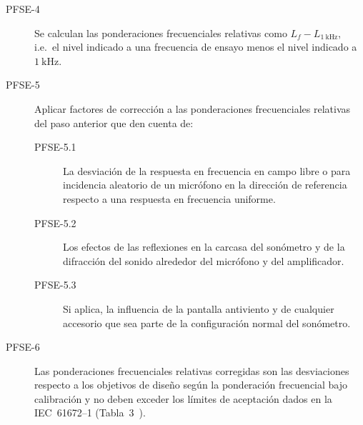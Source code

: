 \begin{description}
    \item[PFSE-4] Se calculan las ponderaciones frecuenciales relativas como $L_{f} - L_{\qty{1}{\kHz}}$, i.e.\ el nivel indicado a una frecuencia de ensayo menos el nivel indicado a $\qty{1}{\kHz}$.

    \item[PFSE-5] Aplicar factores de corrección a las ponderaciones frecuenciales relativas del paso anterior que den cuenta de:
%
    \begin{description}
        \item[PFSE-5.1] La desviación de la respuesta en frecuencia en campo libre o para incidencia aleatorio de un micrófono en la dirección de referencia respecto a una respuesta en frecuencia uniforme.
        \item[PFSE-5.2] Los efectos de las reflexiones en la carcasa del sonómetro y de la difracción del sonido alrededor del micrófono y del amplificador.
        \item[PFSE-5.3] Si aplica, la influencia de la pantalla antiviento y de cualquier accesorio que sea parte de la configuración normal del sonómetro.
    \end{description}

    \item[PFSE-6] Las ponderaciones frecuenciales relativas corregidas son las desviaciones respecto a los objetivos de diseño según la ponderación frecuencial bajo calibración y no deben exceder los límites de aceptación dados en la \mbox{IEC 61672--1} (\mbox{Tabla 3}~\citeyear{IEC_TC29_2013_1}).
\end{description}

